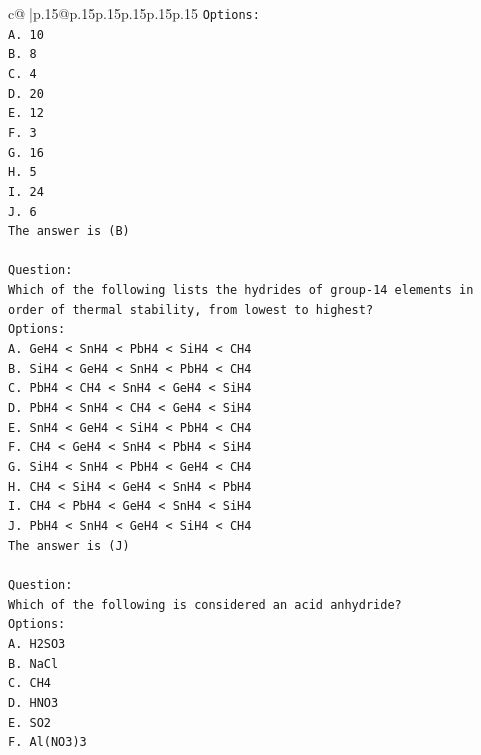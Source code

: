 \documentclass{article}
\begin{document}
{\begin{supertabular}{c@{$\;$}|p{.15\linewidth}@{}p{.15\linewidth}p{.15\linewidth}p{.15\linewidth}p{.15\linewidth}p{.15\linewidth}}
{{{\texttt{Options:} \\
\texttt{A. 10} \\
\texttt{B. 8} \\
\texttt{C. 4} \\
\texttt{D. 20} \\
\texttt{E. 12} \\
\texttt{F. 3} \\
\texttt{G. 16} \\
\texttt{H. 5} \\
\texttt{I. 24} \\
\texttt{J. 6} \\
\texttt{The answer is (B)} \\
\\ 
\texttt{Question:} \\
\texttt{Which of the following lists the hydrides of group{-}14 elements in order of thermal stability, from lowest to highest?} \\
\texttt{Options:} \\
\texttt{A. GeH4 < SnH4 < PbH4 < SiH4 < CH4} \\
\texttt{B. SiH4 < GeH4 < SnH4 < PbH4 < CH4} \\
\texttt{C. PbH4 < CH4 < SnH4 < GeH4 < SiH4} \\
\texttt{D. PbH4 < SnH4 < CH4 < GeH4 < SiH4} \\
\texttt{E. SnH4 < GeH4 < SiH4 < PbH4 < CH4} \\
\texttt{F. CH4 < GeH4 < SnH4 < PbH4 < SiH4} \\
\texttt{G. SiH4 < SnH4 < PbH4 < GeH4 < CH4} \\
\texttt{H. CH4 < SiH4 < GeH4 < SnH4 < PbH4} \\
\texttt{I. CH4 < PbH4 < GeH4 < SnH4 < SiH4} \\
\texttt{J. PbH4 < SnH4 < GeH4 < SiH4 < CH4} \\
\texttt{The answer is (J)} \\
\\ 
\texttt{Question:} \\
\texttt{Which of the following is considered an acid anhydride?} \\
\texttt{Options:} \\
\texttt{A. H2SO3} \\
\texttt{B. NaCl} \\
\texttt{C. CH4} \\
\texttt{D. HNO3} \\
\texttt{E. SO2} \\
\texttt{F. Al(NO3)3} \\
}}}
\end{supertabular}}
\end{document}
